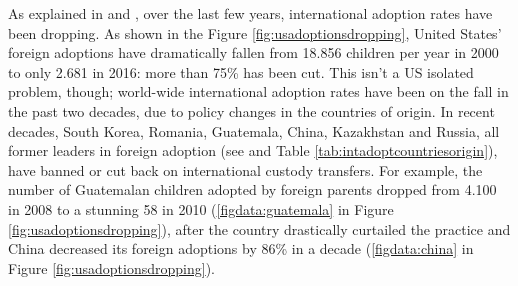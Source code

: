 As explained in \cite{adoptdropping_article} and \cite{adoptdropping_book}, over the last few years, international adoption rates have been dropping. As shown in the Figure \ref{fig:usadoptionsdropping}, United States' foreign adoptions have dramatically fallen from 18.856 children per year in 2000 to only 2.681 in 2016: more than 75\% has been cut. This isn't a US isolated problem, though; world-wide international adoption rates have been on the fall in the past two decades, due to policy changes in the countries of origin. In recent decades, South Korea, Romania, Guatemala, China, Kazakhstan and Russia, all former leaders in foreign adoption (see \cite{unreport} and Table \ref{tab:intadoptcountriesorigin}), have banned or cut back on international custody transfers. For example, the number of Guatemalan children adopted by foreign parents dropped from 4.100 in 2008 to a stunning 58 in 2010 (\ref{figdata:guatemala} in Figure \ref{fig:usadoptionsdropping}), after the country drastically curtailed the practice and China decreased its foreign adoptions by 86\% in a decade (\ref{figdata:china} in Figure \ref{fig:usadoptionsdropping}).

